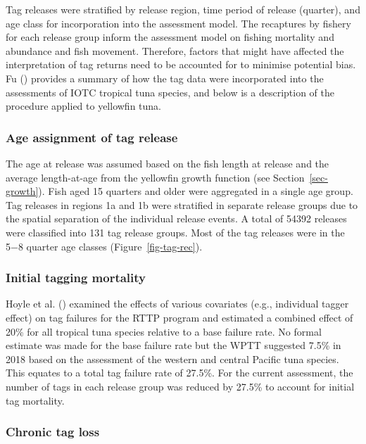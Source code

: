 \documentclass[
]{scrartcl}
\begin{document}
Tag releases were stratified by release region, time period of release
(quarter), and age class for incorporation into the assessment model.
The recaptures by fishery for each release group inform the assessment
model on fishing mortality and abundance and fish movement. Therefore,
factors that might have affected the interpretation of tag returns need
to be accounted for to minimise potential bias. Fu
() provides a summary of how
the tag data were incorporated into the assessments of IOTC tropical
tuna species, and below is a description of the procedure applied to
yellowfin tuna.

\subsubsection{Age assignment of tag
release}\label{age-assignment-of-tag-release}

The age at release was assumed based on the fish length at release and
the average length-at-age from the yellowfin growth function (see
Section~\ref{sec-growth}). Fish aged 15 quarters and older were
aggregated in a single age group. Tag releases in regions 1a and 1b were
stratified in separate release groups due to the spatial separation of
the individual release events. A total of 54392 releases were classified
into 131 tag release groups. Most of the tag releases were in the 5−8
quarter age classes (Figure~\ref{fig-tag-rec}).

\subsubsection{Initial tagging
mortality}\label{initial-tagging-mortality}

Hoyle et al. ()
examined the effects of various covariates (e.g., individual tagger
effect) on tag failures for the RTTP program and estimated a combined
effect of 20\% for all tropical tuna species relative to a base failure
rate. No formal estimate was made for the base failure rate but the WPTT
suggested 7.5\% in 2018 based on the assessment of the western and
central Pacific tuna species. This equates to a total tag failure rate
of 27.5\%. For the current assessment, the number of tags in each
release group was reduced by 27.5\% to account for initial tag
mortality.

\subsubsection{Chronic tag loss}\label{chronic-tag-loss}
\end{document}
